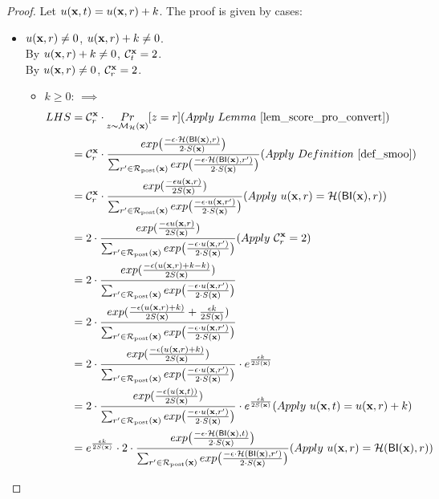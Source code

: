 \documentclass{article}
\begin{document}
\begin{proof}
Let $u(\textbf{x}, {t}) = u(\textbf{x}, {r}) + k$. The proof is given by cases:
\begin{itemize}
  \item {\boldmath$u(\textbf{x}, {r}) \neq 0$, $u(\textbf{x}, {r}) + k \neq 0$}.  \\
  By $u(\textbf{x}, {r}) + k \neq 0$, $\mathcal{C}^{\textbf{x}}_{t} = 2$. \\
  By $u(\textbf{x}, {r}) \neq 0 $, $\mathcal{C}^{\textbf{x}}_{r} = 2$. 
  \begin{itemize}
    \item  $k \geq 0$: $\implies$
      \begin{equation*}
      \begin{split}
      LHS 
      & = \cardinality{\dataobs}{r} \cdot \hexpmechPr{\dataobs}{z = r}     (Apply\ Lemma\ \ref{lem_score_pro_convert})\\
      & = \cardinality{\dataobs}{r} \cdot \frac {exp\big(\frac{-\epsilon\cdot\hellinger(\bysinfer(\dataobs),r)}{2\cdot S(\dataobs)}\big)}{\nomalizer{\dataobs}} 
      (Apply\ Definition\ \ref{def_smoo})\\
      & = \cardinality{\dataobs}{r} \cdot \frac{exp(\frac{-\epsilon \ux{r}}{2 S(\dataobs)})}{\unomalizer{\dataobs}}
      (Apply\ \ux{r} = \hellinger(\bysinfer(\dataobs), r))\\
      & = 2 \cdot \frac{exp(\frac{-\epsilon \ux{r}}{2 S(\dataobs)})}{\unomalizer{\dataobs}}                  (Apply\ \cardinality{\dataobs}{r} = 2)\\
      & = 2 \cdot \frac{exp(\frac{-\epsilon (\ux{r} + k - k)}{2 S(\dataobs)})}{\unomalizer{\dataobs}}\\
      & = 2 \cdot \frac{exp(\frac{-\epsilon (\ux{r} + k)}{2 S(\dataobs)} + \frac{\epsilon k}{2 S(\dataobs)})}{\unomalizer{\dataobs}}\\
      & = 2 \cdot \frac{exp(\frac{-\epsilon (\ux{r} + k)}{2 S(\dataobs)})}{\unomalizer{\dataobs}} \cdot e^{\frac{\epsilon k}{2 S(\dataobs)}}\\
      & = 2 \cdot \frac{exp(\frac{-\epsilon (\ux{t})}{2 S(\dataobs)})}{\unomalizer{\dataobs}} \cdot e^{\frac{\epsilon k}{2 S(\dataobs)}}  (Apply \ \ux{t} = \ux{r} + k)\\
      & = e^{\frac{\epsilon k}{2 S(\dataobs)}} \cdot 2 \cdot \frac {exp\big(\frac{-\epsilon\cdot\hellinger(\bysinfer(\dataobs), t)}{2\cdot S(\dataobs)}\big)}{\nomalizer{\dataobs}}
      (Apply\ \ux{r} = \hellinger(\bysinfer(\dataobs), r))\\

\end{split}
\end{equation*}
\end{itemize}
\end{itemize}
\end{proof}
\end{document}
